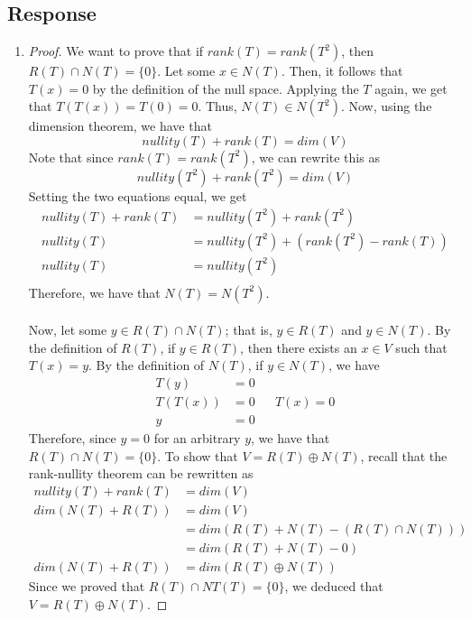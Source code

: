 \documentclass[13pt]{article}
\begin{document}
\subsection*{Response}
\begin{enumerate}[label=(\alph*),leftmargin=*]
\item
  \begin{proof}
    We want to prove that if $rank(T) = rank(T^2)$, then $R(T) \cap N(T) = \{ 0 \}$. Let some $x \in N(T)$. Then, it follows that $T(x) = 0$ by the definition of the null space. Applying the $T$ again, we get that $T(T(x)) = T(0) = 0$. Thus, $N(T) \in N(T^2)$. Now, using the dimension theorem, we have that
    \[nullity(T) + rank(T) = dim(V)\]
    Note that since $rank(T) = rank(T^2)$, we can rewrite this as
    \[nullity(T^2) + rank(T^2) = dim(V)\]
    Setting the two equations equal, we get
    \begin{align*}
      nullity(T) + rank(T) &= nullity(T^2) + rank(T^2) \\
      nullity(T) &= nullity(T^2) + (rank(T^2) - rank(T)) \\
      nullity(T) &= nullity(T^2) \\
    \end{align*}
    Therefore, we have that $N(T) = N(T^2)$. \\ \\
    Now, let some $y \in R(T) \cap N(T)$; that is, $y \in R(T)$ and $y \in N(T)$. By the definition of $R(T)$, if $y \in R(T)$, then there exists an $x \in V$ such that $T(x) = y$. By the definition of $N(T)$, if $y \in N(T)$, we have
    \begin{align*}
      T(y) &= 0 \\
      T(T(x)) &= 0 && T(x) = 0 \\
      y &= 0
    \end{align*}
    Therefore, since $y = 0$ for an arbitrary $y$, we have that $R(T) \cap N(T) = \{ 0 \}$. To show that $V = R(T) \oplus N(T)$, recall that the rank-nullity theorem can be rewritten as
    \begin{align*}
      nullity(T) + rank(T) &= dim(V) \\
      dim(N(T) + R(T)) &= dim(V) \\
                           &= dim(R(T) + N(T) - (R(T) \cap N(T))) \\
                           &= dim(R(T) + N(T) - 0) \\
      dim(N(T) + R(T)) &= dim(R(T) \oplus N(T))
    \end{align*}
    Since we proved that $R(T) \cap NT(T) = \{ 0 \}$, we deduced that $V = R(T) \oplus N(T)$.

\end{proof}
\end{enumerate}
\end{document}

